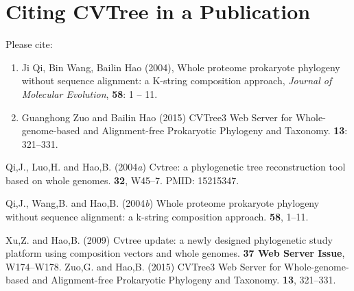 \documentclass[a4paper,12pt]{article}
\begin{document}
\section{Citing CVTree in a Publication}

Please cite:
\begin{enumerate}\itemsep 0pt
\item Ji Qi, Bin Wang, Bailin Hao (2004), Whole proteome prokaryote
  phylogeny without sequence alignment: a K-string composition approach,
  {\it Journal of Molecular Evolution}, {\bf 58}: 1 -- 11.
\item Guanghong Zuo and Bailin Hao (2015) CVTree3 Web Server for 
Whole-genome-based and Alignment-free Prokaryotic Phylogeny and Taxonomy.
 {\bf 13}: 321--331.
\end{enumerate}

\begin{thebibliography}{}
Qi,J., Luo,H.  and Hao,B. (2004{\em{a}}) Cvtree: a phylogenetic tree
  reconstruction tool based on whole genomes.
 {\bf 32}, W45--7.
\newblock PMID: 15215347.

Qi,J., Wang,B.  and Hao,B. (2004{\em{b}}) Whole proteome prokaryote phylogeny
  without sequence alignment: a k-string composition approach.
 {\bf 58}, 1--11.

Xu,Z. and Hao,B. (2009{\em{}}) Cvtree update: a newly designed phylogenetic
  study platform using composition vectors and whole genomes.
 {\bf 37 Web Server Issue}, W174--W178.
Zuo,G. and Hao,B. (2015{\em{}}) CVTree3 Web Server for Whole-genome-based and Alignment-free Prokaryotic Phylogeny and Taxonomy.
 {\bf 13}, 321--331.
\end{thebibliography}
\end{document}
